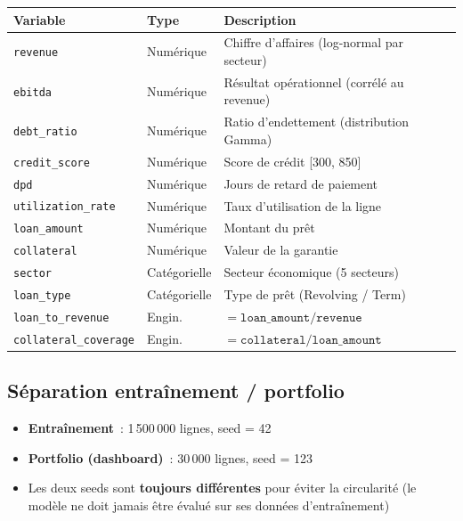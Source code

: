 \documentclass[12pt,a4paper]{article}
\begin{document}
\begin{center}
\begin{tabular}{llp{7cm}}
\toprule
\textbf{Variable} & \textbf{Type} & \textbf{Description} \\
\midrule
\texttt{revenue} & Num\'erique & Chiffre d'affaires (log-normal par secteur) \\
\texttt{ebitda} & Num\'erique & R\'esultat op\'erationnel (corr\'el\'e au revenue) \\
\texttt{debt\_ratio} & Num\'erique & Ratio d'endettement (distribution Gamma) \\
\texttt{credit\_score} & Num\'erique & Score de cr\'edit [300, 850] \\
\texttt{dpd} & Num\'erique & Jours de retard de paiement \\
\texttt{utilization\_rate} & Num\'erique & Taux d'utilisation de la ligne \\
\texttt{loan\_amount} & Num\'erique & Montant du pr\^et \\
\texttt{collateral} & Num\'erique & Valeur de la garantie \\
\texttt{sector} & Cat\'egorielle & Secteur \'economique (5 secteurs) \\
\texttt{loan\_type} & Cat\'egorielle & Type de pr\^et (Revolving / Term) \\
\texttt{loan\_to\_revenue} & Engin. & $= \texttt{loan\_amount} / \texttt{revenue}$ \\
\texttt{collateral\_coverage} & Engin. & $= \texttt{collateral} / \texttt{loan\_amount}$ \\
\bottomrule
\end{tabular}
\end{center}

\subsection{S\'eparation entra\^inement / portfolio}

\begin{warningbox}
\begin{itemize}[noitemsep]
    \item \textbf{Entra\^inement}~: 1\,500\,000 lignes, seed = 42
    \item \textbf{Portfolio (dashboard)}~: 30\,000 lignes, seed = 123
    \item Les deux seeds sont \textbf{toujours diff\'erentes} pour \'eviter la circularit\'e (le mod\`ele ne doit jamais \^etre \'evalu\'e sur ses donn\'ees d'entra\^inement)
\end{itemize}
\end{warningbox}
\end{document}
